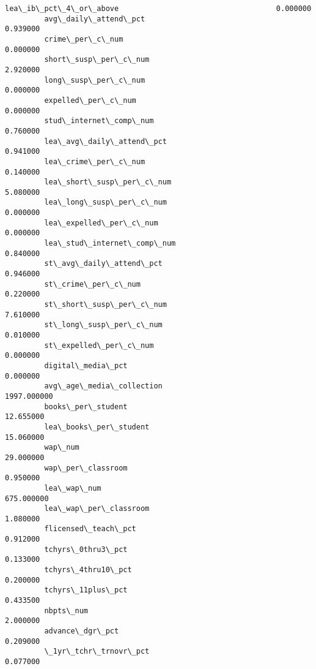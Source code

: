 \documentclass[11pt]{article}
\begin{document}
\begin{Verbatim}[commandchars=\\\{\}]
         lea\_ib\_pct\_4\_or\_above                                    0.000000   
         avg\_daily\_attend\_pct                                     0.939000   
         crime\_per\_c\_num                                          0.000000   
         short\_susp\_per\_c\_num                                     2.920000   
         long\_susp\_per\_c\_num                                      0.000000   
         expelled\_per\_c\_num                                       0.000000   
         stud\_internet\_comp\_num                                   0.760000   
         lea\_avg\_daily\_attend\_pct                                 0.941000   
         lea\_crime\_per\_c\_num                                      0.140000   
         lea\_short\_susp\_per\_c\_num                                 5.080000   
         lea\_long\_susp\_per\_c\_num                                  0.000000   
         lea\_expelled\_per\_c\_num                                   0.000000   
         lea\_stud\_internet\_comp\_num                               0.840000   
         st\_avg\_daily\_attend\_pct                                  0.946000   
         st\_crime\_per\_c\_num                                       0.220000   
         st\_short\_susp\_per\_c\_num                                  7.610000   
         st\_long\_susp\_per\_c\_num                                   0.010000   
         st\_expelled\_per\_c\_num                                    0.000000   
         digital\_media\_pct                                        0.000000   
         avg\_age\_media\_collection                              1997.000000   
         books\_per\_student                                       12.655000   
         lea\_books\_per\_student                                   15.060000   
         wap\_num                                                 29.000000   
         wap\_per\_classroom                                        0.950000   
         lea\_wap\_num                                            675.000000   
         lea\_wap\_per\_classroom                                    1.080000   
         flicensed\_teach\_pct                                      0.912000   
         tchyrs\_0thru3\_pct                                        0.133000   
         tchyrs\_4thru10\_pct                                       0.200000   
         tchyrs\_11plus\_pct                                        0.433500   
         nbpts\_num                                                2.000000   
         advance\_dgr\_pct                                          0.209000   
         \_1yr\_tchr\_trnovr\_pct                                     0.077000   

\end{Verbatim}
\end{document}
